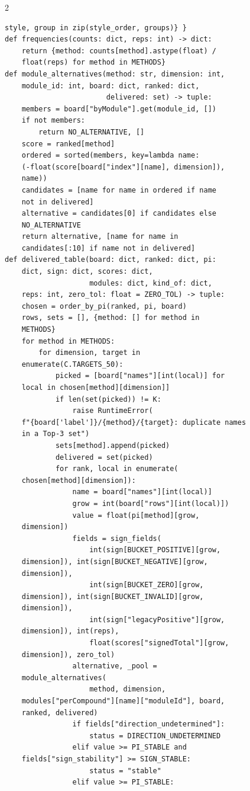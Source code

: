 \begin{multicols}{2}
\begin{Verbatim}[fontsize=\scriptsize]
    style, group in zip(style_order, groups)} }
def frequencies(counts: dict, reps: int) -> dict:
    return {method: counts[method].astype(float) /
    float(reps) for method in METHODS}
def module_alternatives(method: str, dimension: int,
    module_id: int, board: dict, ranked: dict,
                        delivered: set) -> tuple:
    members = board["byModule"].get(module_id, [])
    if not members:
        return NO_ALTERNATIVE, []
    score = ranked[method]
    ordered = sorted(members, key=lambda name:
    (-float(score[board["index"][name], dimension]),
    name))
    candidates = [name for name in ordered if name
    not in delivered]
    alternative = candidates[0] if candidates else
    NO_ALTERNATIVE
    return alternative, [name for name in
    candidates[:10] if name not in delivered]
def delivered_table(board: dict, ranked: dict, pi:
    dict, sign: dict, scores: dict,
                    modules: dict, kind_of: dict,
    reps: int, zero_tol: float = ZERO_TOL) -> tuple:
    chosen = order_by_pi(ranked, pi, board)
    rows, sets = [], {method: [] for method in
    METHODS}
    for method in METHODS:
        for dimension, target in
    enumerate(C.TARGETS_50):
            picked = [board["names"][int(local)] for
    local in chosen[method][dimension]]
            if len(set(picked)) != K:
                raise RuntimeError(
    f"{board['label']}/{method}/{target}: duplicate names
    in a Top-3 set")
            sets[method].append(picked)
            delivered = set(picked)
            for rank, local in enumerate(
    chosen[method][dimension]):
                name = board["names"][int(local)]
                grow = int(board["rows"][int(local)])
                value = float(pi[method][grow,
    dimension])
                fields = sign_fields(
                    int(sign[BUCKET_POSITIVE][grow,
    dimension]), int(sign[BUCKET_NEGATIVE][grow,
    dimension]),
                    int(sign[BUCKET_ZERO][grow,
    dimension]), int(sign[BUCKET_INVALID][grow,
    dimension]),
                    int(sign["legacyPositive"][grow,
    dimension]), int(reps),
                    float(scores["signedTotal"][grow,
    dimension]), zero_tol)
                alternative, _pool =
    module_alternatives(
                    method, dimension,
    modules["perCompound"][name]["moduleId"], board,
    ranked, delivered)
                if fields["direction_undetermined"]:
                    status = DIRECTION_UNDETERMINED
                elif value >= PI_STABLE and
    fields["sign_stability"] >= SIGN_STABLE:
                    status = "stable"
                elif value >= PI_STABLE:

\end{Verbatim}
\end{multicols}
